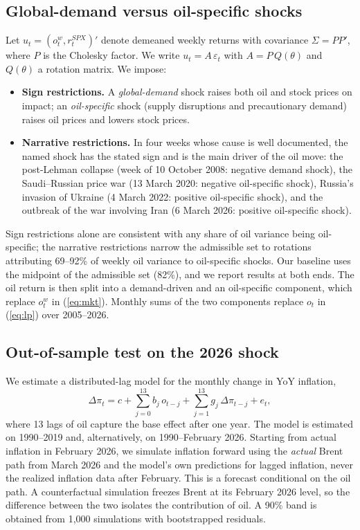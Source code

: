 \documentclass[11pt,a4paper]{article}
\begin{document}
\subsection{Global-demand versus oil-specific shocks}
Let $u_t=(o^w_t, r^{SPX}_t)'$ denote demeaned weekly returns with covariance $\Sigma = PP'$, where $P$ is the Cholesky factor. We write $u_t = A\,\varepsilon_t$ with $A = P\,Q(\theta)$ and $Q(\theta)$ a rotation matrix. We impose:
\begin{itemize}[itemsep=0.1em]
\item \textbf{Sign restrictions.} A \emph{global-demand} shock raises both oil and stock prices on impact; an \emph{oil-specific} shock (supply disruptions and precautionary demand) raises oil prices and lowers stock prices.
\item \textbf{Narrative restrictions.} In four weeks whose cause is well documented, the named shock has the stated sign and is the main driver of the oil move: the post-Lehman collapse (week of 10 October 2008: negative demand shock), the Saudi--Russian price war (13 March 2020: negative oil-specific shock), Russia's invasion of Ukraine (4 March 2022: positive oil-specific shock), and the outbreak of the war involving Iran (6 March 2026: positive oil-specific shock).
\end{itemize}
Sign restrictions alone are consistent with any share of oil variance being oil-specific; the narrative restrictions narrow the admissible set to rotations attributing 69--92\% of weekly oil variance to oil-specific shocks. Our baseline uses the midpoint of the admissible set (82\%), and we report results at both ends. The oil return is then split into a demand-driven and an oil-specific component, which replace $o^w_t$ in (\ref{eq:mkt}). Monthly sums of the two components replace $o_t$ in (\ref{eq:lp}) over 2005--2026.

\subsection{Out-of-sample test on the 2026 shock}
We estimate a distributed-lag model for the monthly change in YoY inflation,
\begin{equation}
\Delta\pi_t = c + \sum_{j=0}^{13} b_j\, o_{t-j} + \sum_{j=1}^{13} g_j\, \Delta\pi_{t-j} + e_t,
\label{eq:ardl}
\end{equation}
where 13 lags of oil capture the base effect after one year. The model is estimated on 1990--2019 and, alternatively, on 1990--February 2026. Starting from actual inflation in February 2026, we simulate inflation forward using the \emph{actual} Brent path from March 2026 and the model's own predictions for lagged inflation, never the realized inflation data after February. This is a forecast conditional on the oil path. A counterfactual simulation freezes Brent at its February 2026 level, so the difference between the two isolates the contribution of oil. A 90\% band is obtained from 1{,}000 simulations with bootstrapped residuals.
\end{document}
